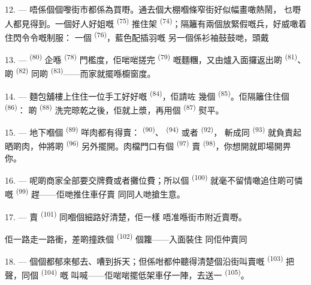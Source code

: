 12. --- 唔係個個嚟街市都係為買嘢。通去個大棚嗰條窄街好似幅畫噉熱鬧，
乜嘢人都見得到。一個好人好姐嘅 \textsuperscript{(75)} 推住架
 \textsuperscript{(74)}；隔籬有兩個放緊假嘅兵，好威噉着住閃令令嘅制服：
一個 \textsuperscript{(76)}，藍色配插羽嘅
另一個係衫袖鼓鼓哋，頭戴

13. ---  \textsuperscript{(80)} 企喺 \textsuperscript{(78)}
門檻度，佢啱啱搓完 \textsuperscript{(79)} 嘅麵糰，又由爐入面攞返出啲
 \textsuperscript{(81)}、啲 \textsuperscript{(82)} 同啲
\textsuperscript{(83)}——而家就擺喺櫥窗度。

14. --- 麵包舖樓上住住一位手工好好嘅 \textsuperscript{(84)}，佢請咗
幾個 \textsuperscript{(85)}。佢隔籬住住個 \textsuperscript{(86)}：
啲 \textsuperscript{(88)} 洗完晾乾之後，佢就上漿，再用個
\textsuperscript{(87)} 熨平。

\VUsaut{4.0mm}
\VUsaut{3.0mm}

15. --- 地下嗰個 \textsuperscript{(89)} 咩肉都有得賣：
\textsuperscript{(90)}、 \textsuperscript{(94)} 或者 \textsuperscript{(92)}，
斬成同 \textsuperscript{(93)}
就負責起晒啲肉，仲將啲 \textsuperscript{(96)} 另外擺開。肉檔門口有個
 \textsuperscript{(97)} 賣 \textsuperscript{(98)}，你想開就即場開畀你。

16. --- 呢啲商家全部要交牌費或者攤位費；所以個 \textsuperscript{(100)}
就毫不留情噉追住啲可憐嘅 \textsuperscript{(99)} 趕——佢哋推住車仔賣
同同人哋搶生意。

\VUsaut{4.0mm}
\VUsaut{3.0mm}

17. --- 賣 \textsuperscript{(101)} 同嗰個細路好清楚，佢一樣
唔准喺街市附近賣嘢。

佢一路走一路衝，差啲撞跌個 \textsuperscript{(102)} 個籮——入面裝住
同佢仲賣同

18. --- 個個都郁來郁去、嘈到拆天；但係咁都仲聽得清楚個沿街叫賣嘅
 \textsuperscript{(103)} 把聲，同個 \textsuperscript{(104)} 嘅
叫喊——佢啱啱擺低架車仔一陣，去送一 \textsuperscript{(105)}。

\VUsaut{6.0mm}
\VUfilet{22mm}
